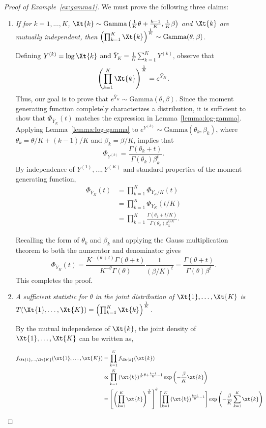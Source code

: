 \documentclass[12pt]{article}
\begin{document}
\begin{proof}[Proof of Example~\ref{ex:gamma1}]
We must prove the following three claims:
\begin{enumerate}
    \item \emph{If for $k=1,\dots,K$, $\Xt{k} \sim \text{Gamma}\left(\frac{1}{K}\theta + \frac{k-1}{K}, \frac{1}{K}\beta\right)$ and $\Xt{k}$ are mutually independent, then $\left(\prod_{k=1}^K \Xt{k}\right)^{\frac{1}{K}} \sim \text{Gamma}(\theta, \beta)$.} 

Defining $Y^{(k)}=\log\Xt{k}$ and $\bar Y_K=\frac{1}{K}\sum_{k=1}^KY^{(k)}$, observe that
$$
\left(\prod_{k=1}^K \Xt{k}\right)^{\frac{1}{K}}=e^{\bar Y_K}.
$$
Thus, our goal is to prove that $e^{\bar Y_K}\sim \text{Gamma}(\theta, \beta)$.  Since the moment generating function completely characterizes a distribution, it is sufficient to show that 
$\Phi_{\bar Y_K}(t)$ matches the expression in Lemma~\ref{lemma:log-gamma}. Applying Lemma~\ref{lemma:log-gamma} to $e^{Y^{(k)}}\sim\text{Gamma}(\theta_k,\beta_k)$, where $\theta_k=\theta/K+(k-1)/K$ and $\beta_k=\beta/K$, implies that 
$$
\Phi_{Y^{(k)}}=\frac{\Gamma(\theta_k+t)}{\Gamma(\theta_k)\beta_k^{t}}.
$$
By independence of $Y^{(1)},\ldots,Y^{(K)}$ and standard properties of the moment generating function,
\begin{align*}    
\Phi_{\bar Y_K}(t)&=\prod_{k=1}^K\Phi_{Y_K/K}(t)\\
&=\prod_{k=1}^K\Phi_{Y_K}(t/K)\\
&=\prod_{k=1}^K\frac{\Gamma(\theta_k+t/K)}{\Gamma(\theta_k)\beta_k^{t/K}}.
\end{align*}

Recalling the form of $\theta_k$ and $\beta_k$ and applying the Gauss multiplication theorem \citep[page 256]{abramowitz1972handbook} to both the numerator and denominator gives
$$
\Phi_{\bar Y_K}(t)=\frac{K^{-(\theta+t)}\Gamma(\theta+t)}{K^{-\theta}\Gamma(\theta)}\frac{1}{(\beta/K)^t}=\frac{\Gamma(\theta+t)}{\Gamma(\theta)\beta^t}.
$$
This completes the proof.

    \item \emph{A sufficient statistic for $\theta$ in the joint distribution of $\Xt{1},\dots,\Xt{K}$ is $T(\Xt{1},\dots,\Xt{K})=\left(\prod_{k=1}^K \Xt{k}\right)^{\frac{1}{K}}$.}

By the mutual independence of $\Xt{k}$, the joint density of $\Xt{1},\dots,\Xt{K}$ can be written as,

\begin{align*} 
f_{\Xt{1},\dots,\Xt{K}}(\xt{1},\dots,\xt{K}) &= \prod_{k=1}^K f_{\Xt{k}}(\xt{k}) \\
&\propto \prod_{k=1}^K \left(\xt{k}\right)^{\frac{1}{K}\theta + \frac{k-1}{K} - 1}\exp\left(-\frac{\beta}{K}\xt{k}\right) \\
&=\left[\left(\prod_{k=1}^K \xt{k}\right)^{\frac{1}{K}}\right]^{\theta}\left[\prod_{k=1}^K \left(\xt{k}\right)^{\frac{k-1}{K}-1}\right]\exp\left(-\frac{\beta}{K}\sum_{k=1}^K\xt{k}\right)
\end{align*}


\end{enumerate}
\end{proof}
\end{document}
